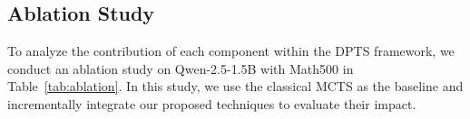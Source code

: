 \begin{table}
    \centering
    \caption{Ablation study of each component in DPTS framework. ``AP'': adaptive parallelism. ``S'': Searching. ``T'': Transition. ``Best Index'': The average index of terminated path leads to the best solution.  }
    \vspace{-0.1in}
    \label{tab:ablation}
    \vspace{-0.2in}
\end{table}


\subsection{Ablation Study}

To analyze the contribution of each component within the DPTS framework, we conduct an ablation study on Qwen-2.5-1.5B with Math500 in Table~\ref{tab:ablation}. In this study, we use the classical MCTS as the baseline and incrementally integrate our proposed techniques to evaluate their impact. 

